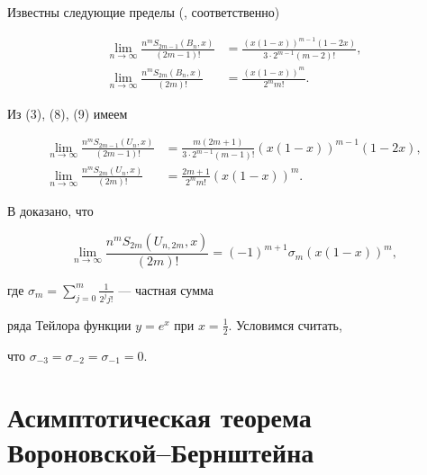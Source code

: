 Известны следующие пределы (\cite{5}, \cite{3} соответственно) 


\begin{align} 


\lim_{n\to\infty}\frac{n^m S_{2m-1}(B_n,x)}{(2m-1)!}&= 


\frac{(x(1-x))^{m-1}(1-2x)}{3\cdot 2^{m-1}(m-2)!},\\ 


% 


\lim_{n\to\infty}\frac{n^m S_{2m}(B_n,x)}{(2m)!}&= 


\frac{(x(1-x))^m}{2^m m!}. 


\end{align} 


Из (3), (8), (9) имеем 


\begin{align} 


\lim_{n\to\infty}\frac{n^m S_{2m-1}(U_n,x)}{(2m-1)!}&= 


\frac{m(2m+1)}{3\cdot 2^{m-1}(m-1)!} 


(x(1-x))^{m-1}(1-2x),\\ 


% 


\lim_{n\to\infty}\frac{n^m S_{2m}(U_n,x)}{(2m)!}&= 


\frac{2m+1}{2^m m!}(x(1-x))^m. 


\end{align} 


В \cite{6} доказано, что 


\begin{equation} 


\lim_{n\to\infty}\frac{n^m S_{2m}(U_{n,2m},x)}{(2m)!}= 


(-1)^{m+1}\sigma_m(x(1-x))^m, 


\end{equation} 


где $\sigma_m=\sum\limits^m_{j=0}\frac{1}{2^j j!}$ --- частная сумма 


ряда Тейлора функции $y=e^x$ при $x=\frac{1}{2}$. Условимся считать, 


что $\sigma_{-3}=\sigma_{-2}=\sigma_{-1}=0$. 


 


\section{Асимптотическая теорема Вороновской--Бернштейна} 


